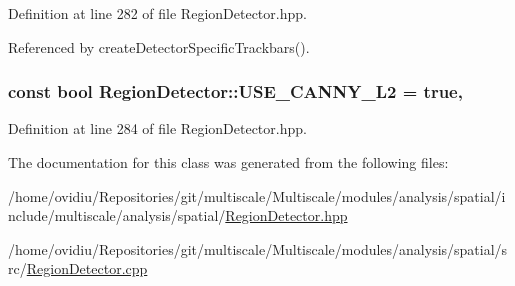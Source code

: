 Definition at line 282 of file Region\-Detector.\-hpp.



Referenced by create\-Detector\-Specific\-Trackbars().

\hypertarget{classmultiscale_1_1analysis_1_1RegionDetector_a6a8c4f7b9a6bc40ec6de940f53943772}{
\subsubsection[{U\-S\-E\-\_\-\-C\-A\-N\-N\-Y\-\_\-\-L2}]{\setlength{\rightskip}{0pt plus 5cm}const bool Region\-Detector\-::\-U\-S\-E\-\_\-\-C\-A\-N\-N\-Y\-\_\-\-L2 = true\hspace{0.3cm}{\ttfamily [static]}, {\ttfamily [private]}}}\label{classmultiscale_1_1analysis_1_1RegionDetector_a6a8c4f7b9a6bc40ec6de940f53943772}


Definition at line 284 of file Region\-Detector.\-hpp.



The documentation for this class was generated from the following files\-:\begin{DoxyCompactItemize}
\item 
/home/ovidiu/\-Repositories/git/multiscale/\-Multiscale/modules/analysis/spatial/include/multiscale/analysis/spatial/\hyperlink{RegionDetector_8hpp}{Region\-Detector.\-hpp}\item 
/home/ovidiu/\-Repositories/git/multiscale/\-Multiscale/modules/analysis/spatial/src/\hyperlink{RegionDetector_8cpp}{Region\-Detector.\-cpp}\end{DoxyCompactItemize}
